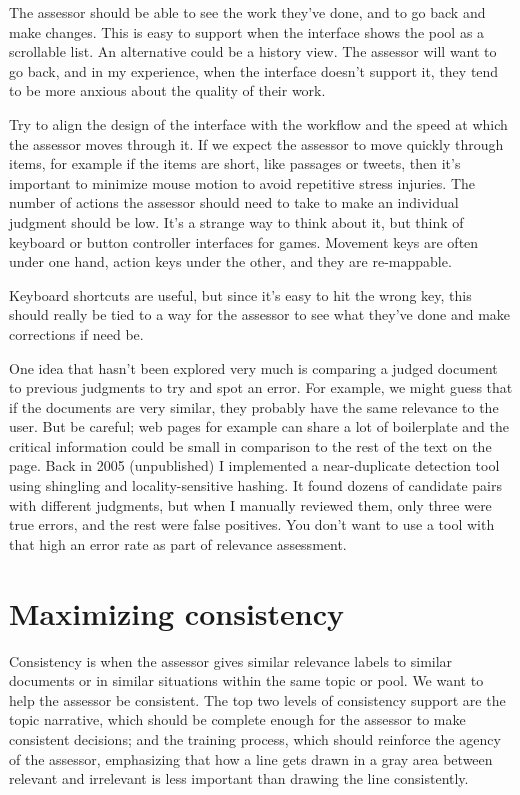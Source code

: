 \documentclass[nobib]{tufte-book}
\begin{document}
The assessor should be able to see the work they've done, and to go back and make changes.  This is easy to support when the interface shows the pool as a scrollable list.  An alternative could be a history view.  The assessor will want to go back, and in my experience, when the interface doesn't support it, they tend to be more anxious about the quality of their work.

Try to align the design of the interface with the workflow and the speed at which the assessor moves through it.  If we expect the assessor to move quickly through items, for example if the items are short, like passages or tweets, then it's important to minimize mouse motion to avoid repetitive stress injuries.  The number of actions the assessor should need to take to make an individual judgment should be low.  It's a strange way to think about it, but think of keyboard or button controller interfaces for games.  Movement keys are often under one hand, action keys under the other, and they are re-mappable.

Keyboard shortcuts are useful, but since it's easy to hit the wrong key, this should really be tied to a way for the assessor to see what they've done and make corrections if need be.

One idea that hasn't been explored very much is comparing a judged document to previous judgments to try and spot an error.  For example, we might guess that if the documents are very similar, they probably have the same relevance to the user.  But be careful; web pages for example can share a lot of boilerplate and the critical information could be small in comparison to the rest of the text on the page.  Back in 2005 (unpublished) I implemented a near-duplicate detection tool using shingling and locality-sensitive hashing.  It found dozens of candidate pairs with different judgments, but when I manually reviewed them, only three were true errors, and the rest were false positives.  You don't want to use a tool with that high an error rate as part of relevance assessment.

\section{Maximizing consistency}

Consistency is when the assessor gives similar relevance labels to similar documents or in similar situations within the same topic or pool.  We want to help the assessor be consistent.  The top two levels of consistency support are the topic narrative, which should be complete enough for the assessor to make consistent decisions; and the training process, which should reinforce the agency of the assessor, emphasizing that how a line gets drawn in a gray area between relevant and irrelevant is less important than drawing the line consistently.
\end{document}
